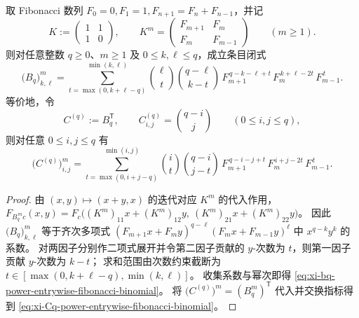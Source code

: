 \begin{proposition}\label{prop:xi-bq-power-entrywise-fibonacci-binomial}
取 Fibonacci 数列 \(F_0=0,F_1=1,F_{n+1}=F_n+F_{n-1}\)，并记
\[
K:=\begin{pmatrix}1&1\\[2pt]1&0\end{pmatrix},
\qquad
K^m=\begin{pmatrix}F_{m+1}&F_m\\[2pt]F_m&F_{m-1}\end{pmatrix}\qquad(m\ge 1).
\]
则对任意整数 \(q\ge 0\)、\(m\ge 1\) 及 \(0\le k,\ell\le q\)，成立条目闭式
\begin{equation}\label{eq:xi-bq-power-entrywise-fibonacci-binomial}
\bigl(B_q\bigr)^{m}_{k,\ell}
=
\sum_{t=\max(0,k+\ell-q)}^{\min(k,\ell)}
\binom{\ell}{t}\binom{q-\ell}{k-t}\,
F_{m+1}^{\,q-k-\ell+t}\,
F_{m}^{\,k+\ell-2t}\,
F_{m-1}^{\,t}.
\end{equation}
等价地，令
\[
C^{(q)}:=B_q^{\mathsf T},\qquad
C^{(q)}_{i,j}=\binom{q-i}{j}\qquad(0\le i,j\le q),
\]
则对任意 \(0\le i,j\le q\) 有
\begin{equation}\label{eq:xi-Cq-power-entrywise-fibonacci-binomial}
\bigl(C^{(q)}\bigr)^{m}_{i,j}
=
\sum_{t=\max(0,i+j-q)}^{\min(i,j)}
\binom{i}{t}\binom{q-i}{j-t}\,
F_{m+1}^{\,q-i-j+t}\,
F_{m}^{\,i+j-2t}\,
F_{m-1}^{\,t}.
\end{equation}
\end{proposition}
\begin{proof}
由 \((x,y)\mapsto(x+y,x)\) 的迭代对应 \(K^m\) 的代入作用，
\(
F_{B_q^{\,m}c}(x,y)=F_c\bigl((K^m)_{11}x+(K^m)_{12}y,\ (K^m)_{21}x+(K^m)_{22}y\bigr)
\)。
因此 \(\bigl(B_q\bigr)^m_{k,\ell}\) 等于齐次多项式
\(
(F_{m+1}x+F_my)^{q-\ell}(F_mx+F_{m-1}y)^{\ell}
\)
中 \(x^{q-k}y^k\) 的系数。
对两因子分别作二项式展开并令第二因子贡献的 \(y\)-次数为 \(t\)，则第一因子贡献 \(y\)-次数为 \(k-t\)；
求和范围由次数约束截断为
\(
t\in[\max(0,k+\ell-q),\min(k,\ell)]
\)。
收集系数与幂次即得 \eqref{eq:xi-bq-power-entrywise-fibonacci-binomial}。
将 \(\bigl(C^{(q)}\bigr)^m=(B_q^m)^{\mathsf T}\) 代入并交换指标得到 \eqref{eq:xi-Cq-power-entrywise-fibonacci-binomial}。
\end{proof}

